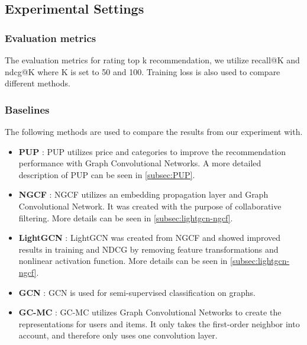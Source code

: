 \subsection{Experimental Settings}
\subsubsection{Evaluation metrics}
The evaluation metrics for rating top k recommendation, we utilize recall@K and ndcg@K where K is set to 50 and 100.
Training loss is also used to compare different methods.

\subsubsection{Baselines}
The following methods are used to compare the results from our experiment with.
\begin{itemize}
    \item \textbf{PUP} \cite{Priceaware}: PUP utilizes price and categories to improve the recommendation performance with Graph Convolutional Networks. A more detailed description of PUP can be seen in \autoref{subsec:PUP}.
    \item \textbf{NGCF} \cite{NGCF_2019}: NGCF utilizes an embedding propagation layer and Graph Convolutional Network. It was created with the purpose of collaborative filtering. More details can be seen in \autoref{subsec:lightgcn-ngcf}.
    \item \textbf{LightGCN} \cite{lightgcn}: LightGCN was created from NGCF and showed improved results in training and NDCG by removing feature transformations and nonlinear activation function. More details can be seen in \autoref{subsec:lightgcn-ngcf}.
    \item \textbf{GCN} \cite{kipf2017semisupervised}: GCN is used for semi-supervised classification on graphs.
    \item \textbf{GC-MC} \cite{berg2017graph}: GC-MC utilizes Graph Convolutional Networks to create the representations for users and items. It only takes the first-order neighbor into account, and therefore only uses one convolution layer.
\end{itemize}